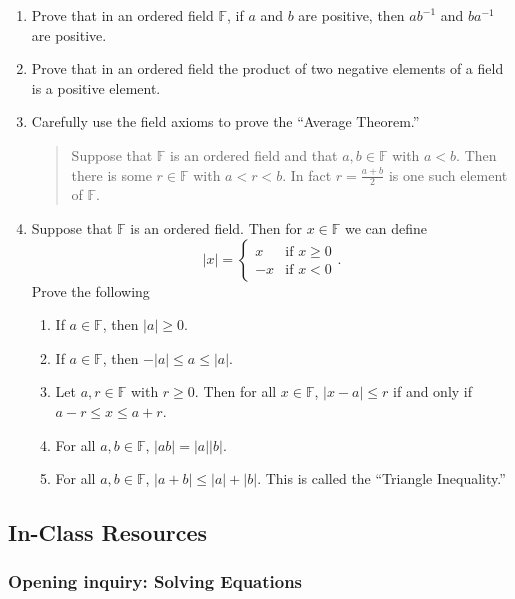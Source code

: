 \documentclass[11pt]{article}
\theoremstyle{definition}
\begin{document}
\begin{enumerate}
  \item Prove that in an ordered field $\mathbb{F}$, if $a$ and $b$ are positive, then $ab^{-1}$ and $ba^{-1}$ are positive.

  \item Prove that in an ordered field the product of two negative elements of a field is a positive element.


\item Carefully use the field axioms to prove the ``Average Theorem.''
  \begin{quotation}
    Suppose that $\mathbb{F}$ is an ordered field and that $a,b\in\mathbb{F}$ with $a<b$. Then there is some $r\in\mathbb{F}$ with
    $a < r < b$. In fact $r = \frac{a+b}{2}$ is one such element of $\mathbb{F}$.
  \end{quotation}

\item Suppose that $\mathbb{F}$ is an ordered field. Then for $x\in\mathbb{F}$ we can define
  \[ |x| = \begin{cases}
      x &\text{if }x\geq 0\\
      -x &\text{if }x < 0
  \end{cases}.\]
  Prove the following 
  \begin{enumerate}
    \item If $a\in\mathbb{F}$, then $|a| \geq 0$.
    \item If $a\in\mathbb{F}$, then $-|a|\leq a \leq |a|$.
    \item Let $a,r\in\mathbb{F}$ with $r\geq 0$. Then for all $x\in\mathbb{F}$, $|x-a|\leq r$ if and only if $a-r\leq x \leq a+r$.
    \item For all $a,b\in\mathbb{F}$, $|ab| = |a||b|$.
    \item For all $a,b\in\mathbb{F}$, $|a+b|\leq |a|+|b|$. This is called the ``Triangle Inequality.''
  \end{enumerate}
\end{enumerate}

\newpage \subsection{In-Class Resources}

\subsubsection{Opening inquiry: Solving Equations}
\end{document}
